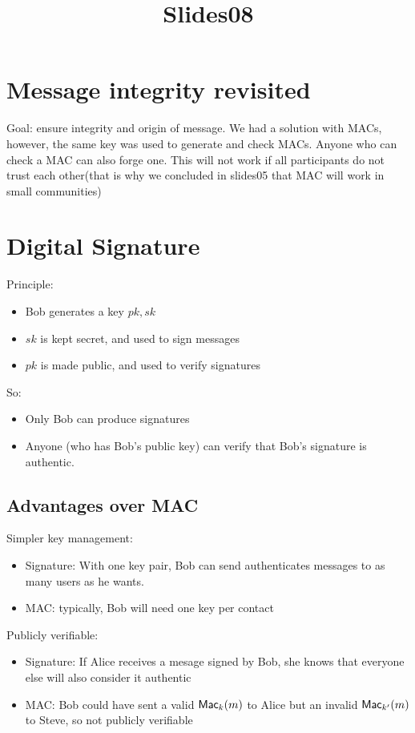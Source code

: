 \documentclass[12pt]{article}
\title{Slides08}
\begin{document}
\maketitle
\tableofcontents
\newpage



\section{Message integrity revisited}
Goal: ensure integrity and origin of message. We had a solution with MACs, however, the same key was used to generate and check MACs. Anyone who can check a MAC can also forge one. This will not work if all participants do not trust each other(that is why we concluded in slides05 that MAC will work in small communities)

\section{Digital Signature}
Principle:
\begin{itemize}
	\item Bob generates a key $pk,sk$
	\item $sk$ is kept secret, and used to sign messages
	\item $pk$ is made public, and used to verify signatures
\end{itemize}

So:
\begin{itemize}
	\item Only Bob can produce signatures
	\item Anyone (who has Bob's public key) can verify that Bob's signature is authentic.
\end{itemize}

\subsection{Advantages over MAC}
Simpler key management:
\begin{itemize}
	\item Signature: With one key pair, Bob can send authenticates messages to as many users as he wants.
	\item MAC: typically, Bob will need one key per contact
\end{itemize}

Publicly verifiable:
\begin{itemize}
	\item Signature: If Alice receives a mesage signed by Bob, she knows that everyone else will also consider it authentic
	\item MAC: Bob could have sent a valid $\operatorname{\mathsf{Mac}}_k(m)$ to Alice but an invalid $\operatorname{\mathsf{Mac}}_{k'}(m)$ to Steve, so not publicly verifiable
\end{itemize}
\end{document}

